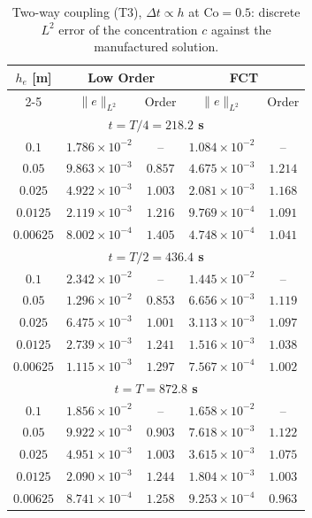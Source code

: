 \begin{table}[h]
\centering
\begin{tabular}{c|cc|cc}
\hline
\multirow{2}{*}{$h_e$ [m]}
& \multicolumn{2}{c|}{\textbf{Low Order}}
& \multicolumn{2}{c}{\textbf{FCT}} \\
\cline{2-5}
& $\|e\|_{L^2}$ & Order
& $\|e\|_{L^2}$ & Order \\
\hline
\hline

\multicolumn{5}{c}{\textbf{$t = T/4 = 218.2$ s}} \\
\hline
$0.1$        & $1.786\times10^{-2}$ & --
           & $1.084\times10^{-2}$ & -- \\
$0.05$       & $9.863\times10^{-3}$ & $0.857$
           & $4.675\times10^{-3}$ & $1.214$ \\
$0.025$      & $4.922\times10^{-3}$ & $1.003$
           & $2.081\times10^{-3}$ & $1.168$ \\
$0.0125$     & $2.119\times10^{-3}$ & $1.216$
           & $9.769\times10^{-4}$ & $1.091$ \\
$0.00625$    & $8.002\times10^{-4}$ & $1.405$
           & $4.748\times10^{-4}$ & $1.041$ \\
\hline\hline

\multicolumn{5}{c}{\textbf{$t = T/2 = 436.4$ s}} \\
\hline
$0.1$        & $2.342\times10^{-2}$ & --
           & $1.445\times10^{-2}$ & -- \\
$0.05$       & $1.296\times10^{-2}$ & $0.853$
           & $6.656\times10^{-3}$ & $1.119$ \\
$0.025$      & $6.475\times10^{-3}$ & $1.001$
           & $3.113\times10^{-3}$ & $1.097$ \\
$0.0125$     & $2.739\times10^{-3}$ & $1.241$
           & $1.516\times10^{-3}$ & $1.038$ \\
$0.00625$    & $1.115\times10^{-3}$ & $1.297$
           & $7.567\times10^{-4}$ & $1.002$ \\
\hline\hline

\multicolumn{5}{c}{\textbf{$t = T = 872.8$ s}} \\
\hline
$0.1$        & $1.856\times10^{-2}$ & --
           & $1.658\times10^{-2}$ & -- \\
$0.05$       & $9.922\times10^{-3}$ & $0.903$
           & $7.618\times10^{-3}$ & $1.122$ \\
$0.025$      & $4.951\times10^{-3}$ & $1.003$
           & $3.615\times10^{-3}$ & $1.075$ \\
$0.0125$     & $2.090\times10^{-3}$ & $1.244$
           & $1.804\times10^{-3}$ & $1.003$ \\
$0.00625$    & $8.741\times10^{-4}$ & $1.258$
           & $9.253\times10^{-4}$ & $0.963$ \\
\hline
\end{tabular}
\caption{Two-way coupling (T3), $\Delta t\propto h$ at $\mathrm{Co}=0.5$: discrete $L^2$ error of the concentration $c$ against the manufactured solution.}
\label{tab:mms_t3_c}
\end{table}
